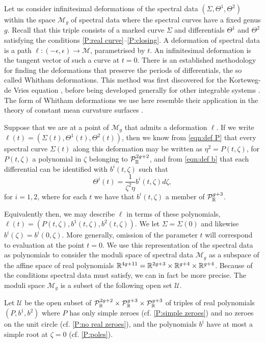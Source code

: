 \documentclass{article}
\begin{document}
Let us consider infinitesimal deformations of the spectral data $(\Sigma,\Theta^1,\Theta^2)$ within the space $\mathcal{M}_g$ of spectral data where the spectral curves have a fixed genus $g$. Recall that this triple consists of a marked curve $\Sigma$ and differentials $\Theta^1$ and $\Theta^2$ satisfying the conditions \ref{P:real curve}--\ref{P:closing}.
A deformation of spectral data is a path $\ell:(-\epsilon,\epsilon) \to \mathcal{M}$, parametrised by $t$. An infinitesimal deformation is the tangent vector of such a curve at $t=0$.
There is an established methodology for finding the deformations that preserve the periods of differentials, the so called Whitham deformations. This method was first discovered for the Korteweg-de Vries equation \cite{Flaschka1980,Lax1983}, before being developed generally for other integrable systems \cite{Krichever1995}. The form of Whitham deformations we use here resemble their application in the theory of constant mean curvature surfaces \cite{Kilian2015a,Carberry2016}.

Suppose that we are at a point of $\mathcal{M}_g$ that admits a deformation $\ell$. If we write $\ell(t) = (\Sigma(t),\Theta^1(t),\Theta^2(t))$, then we know from \eqref{eqn:def P} that every spectral curve $\Sigma(t)$ along this deformation may be written as $\eta^2 = P(t,\zeta)$, for $P(t,\zeta)$ a polynomial in $\zeta$ belonging to $\mathcal{P}^{2g+2}_{\mathbb{R}}$, and from \eqref{eqn:def b} that each differential can be identified with $b^i(t,\zeta)$ such that
\[
\Theta^i(t) = \frac{1}{\zeta^2\eta}b^i(t,\zeta) d\zeta,
\]
for $i=1,2$, where for each $t$ we have that $b^i(t,\zeta)$ a member of $\mathcal{P}^{g+3}_{\mathbb{R}}$.

Equivalently then, we may describe $\ell$ in terms of these polynomials, $\ell(t) = (P(t,\zeta),b^1(t,\zeta),b^2(t,\zeta))$.
We let $\Sigma = \Sigma(0)$ and likewise $b^i(\zeta) = b^i(0,\zeta)$.
More generally, omission of the parameter $t$ will correspond to evaluation at the point $t=0$. We use this representation of the spectral data as polynomials to consider the moduli space of spectral data $\mathcal{M}_g$ as a subspace of the affine space of real polynomials $\mathbb{R}^{4g+11} = \mathbb{R}^{2g+3}\times\mathbb{R}^{g+4}\times\mathbb{R}^{g+4}$. Because of the conditions spectral data must satisfy, we can in fact be more precise. The moduli space $\mathcal{M}_g$ is a subset of the following open set $\mathcal{U}$.

\begin{defn}
\label{def:def U}
Let $\mathcal{U}$ be the open subset of $\mathcal{P}^{2g+2}_{\mathbb{R}}\times \mathcal{P}^{g+3}_{\mathbb{R}}\times\mathcal{P}^{g+3}_{\mathbb{R}}$ of triples of real polynomials $(P,b^1,b^2)$ where
$P$ has only simple zeroes (cf. \ref{P:simple zeroes}) and no zeroes on the unit circle (cf. \ref{P:no real zeroes}), and the polynomials $b^i$ have at most a simple root at $\zeta=0$ (cf. \ref{P:poles}).
\end{defn}
\end{document}

